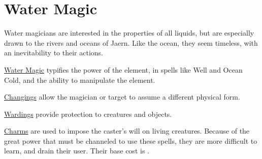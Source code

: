 \chapter{Water Magic}
\label{ch:elemental-water-magic}

Water magicians are interested in the properties of all liquids, but are especially drawn to the rivers and oceans of Jaern.
Like the ocean, they seem timeless, with an inevitability to their actions.

\ul{Water Magic} typifies the power of the element, in spells like Well and Ocean Cold, and the ability to manipulate the element.

\ul{Changings} allow the magician or target to assume a different physical form.

\ul{Wardings} provide protection to creatures and objects.

\ul{Charms} are used to impose the caster's will on living creatures. Because of the great power that must be channeled to use these spells, they are more difficult to learn, and drain their user. Their base cost is .


